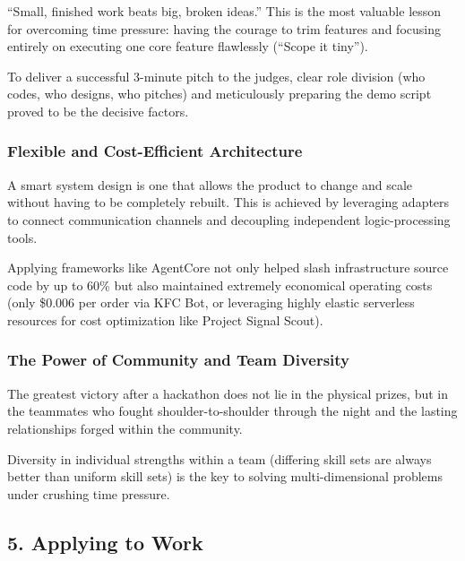 ``Small, finished work beats big, broken ideas.'' This is the most
valuable lesson for overcoming time pressure: having the courage to trim
features and focusing entirely on executing one core feature flawlessly
(``Scope it tiny'').

To deliver a successful 3-minute pitch to the judges, clear role
division (who codes, who designs, who pitches) and meticulously
preparing the demo script proved to be the decisive factors.

\hypertarget{flexible-and-cost-efficient-architecture}{%
\subsubsection{Flexible and Cost-Efficient
Architecture}}

A smart system design is one that allows the product to change and scale
without having to be completely rebuilt. This is achieved by leveraging
adapters to connect communication channels and decoupling independent
logic-processing tools.

Applying frameworks like AgentCore not only helped slash infrastructure
source code by up to 60\% but also maintained extremely economical
operating costs (only \$0.006 per order via KFC Bot, or leveraging
highly elastic serverless resources for cost optimization like Project
Signal Scout).

\hypertarget{the-power-of-community-and-team-diversity}{%
\subsubsection{The Power of Community and Team
Diversity}}

The greatest victory after a hackathon does not lie in the physical
prizes, but in the teammates who fought shoulder-to-shoulder through the
night and the lasting relationships forged within the community.

Diversity in individual strengths within a team (differing skill sets
are always better than uniform skill sets) is the key to solving
multi-dimensional problems under crushing time pressure.

\hypertarget{applying-to-work}{%
\subsection{5. Applying to Work}}

